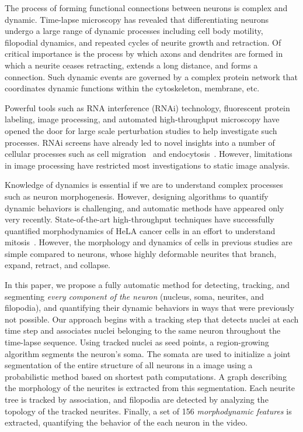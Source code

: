 

The  process  of forming  functional  connections  between neurons  is
complex  and   dynamic.   Time-lapse  microscopy   has  revealed  that
differentiating  neurons undergo  a large  range of  dynamic processes
including cell body motility, filopodial dynamics, and repeated cycles
of  neurite growth  and  retraction.  Of  critical  importance is  the
process  by which  axons and  dendrites are  formed in  which a neurite
ceases retracting, extends a   long  distance, and  forms
a connection. Such  dynamic events are  governed by a  complex protein
network that  coordinates   dynamic functions 
within the cytoskeleton, membrane, etc.

Powerful tools such as 
RNA interference  (RNAi)
technology,  fluorescent  protein   labeling,  image  processing,  and
automated high-throughput  microscopy have  opened the door  for large
scale  perturbation studies to help investigate such processes. RNAi  screens have  already led  to novel
insights   into  a  number   of  cellular   processes  such   as  cell
migration~\cite{Bakal07}  and endocytosis~\cite{Collinet10}.  However,
limitations  in  image  processing  have  restricted  most
investigations to static image analysis.

Knowledge  of dynamics is  essential if we are  to understand
complex  processes such  as neuron  morphogenesis.  However, designing
algorithms to quantify dynamic  behaviors is challenging, and
automatic methods  have appeared only  very recently. State-of-the-art
high-throughput techniques have successfully quantified morphodynamics
of  HeLA cancer  cells  in an  effort  to understand 
mitosis~\cite{Held10,Neumann10,Zhu05}.   However,  the morphology  and
dynamics of  cells in previous studies are simple compared to neurons,
whose highly deformable  neurites that branch, expand,
retract, and collapse. 

In this paper, we propose a  fully automatic method for detecting, tracking, and
segmenting {\em  every component  of the neuron}  (nucleus, soma,  neurites, and
filopodia), and quantifying their dynamic behaviors in ways that were previously
not possible. Our  approach begins with a tracking step that detects nuclei at each  time step and
associates nuclei  belonging to the  same neuron  throughout the
time-lapse sequence.
Using tracked nuclei as  seed points, a region-growing  algorithm segments
the neuron's soma.  The somata are  used to initialize a  joint segmentation of
the entire structure  of all neurons in a  image using a probabilistic
method based on  shortest path computations.  A graph  describing the morphology
of  the neurites  is extracted  from this  segmentation.  Each  neurite  tree is
tracked by association, and filopodia  are detected by analyzing the topology of
the tracked  neurites.  Finally,  a set of  156 {\em morphodynamic  features} is
extracted, quantifying the behavior of the each neuron in the video.


